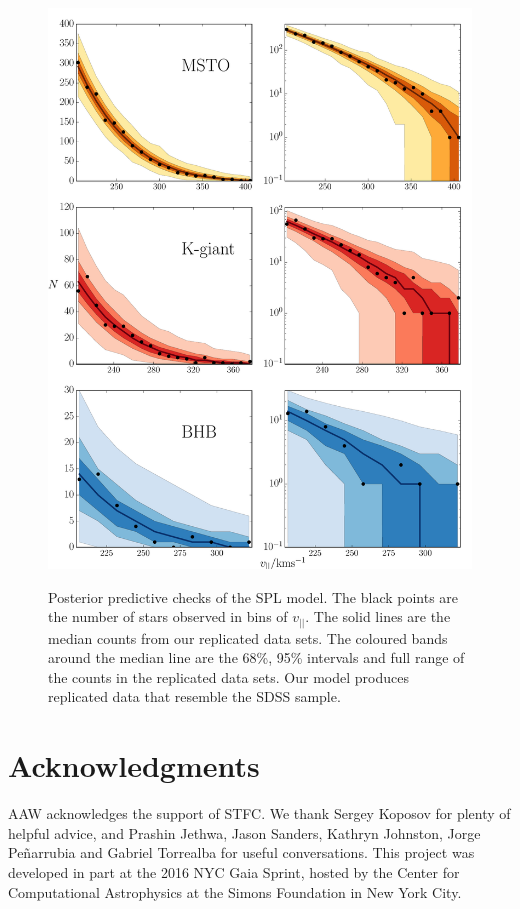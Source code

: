 \documentclass[useAMS,twocolumn,usenatbib]{mn2e}
\def\vlos{{v_{||}}}
\begin{document}
\begin{figure}
\includegraphics[width=1.5\columnwidth]{plots/ppc}\\
\caption{Posterior predictive checks of the SPL model. 
The black points are the number of stars observed in bins of $\vlos$. 
The solid lines are the median counts from our replicated data sets. 
The coloured bands around the median line are the 68\%, 95\% intervals and full range of the counts in the replicated data sets. 
Our model produces replicated data that resemble the SDSS sample.}
\label{fig:ppc}
\end{figure}

\section*{Acknowledgments}
AAW acknowledges the support of STFC. 
We thank Sergey Koposov for plenty of helpful advice, and Prashin Jethwa, Jason Sanders, Kathryn Johnston, Jorge Pe\~{n}arrubia and Gabriel Torrealba for useful conversations. 
This project was developed in part at the 2016 NYC Gaia Sprint, hosted by the Center for Computational Astrophysics at the Simons Foundation in New York City.
\end{document}
